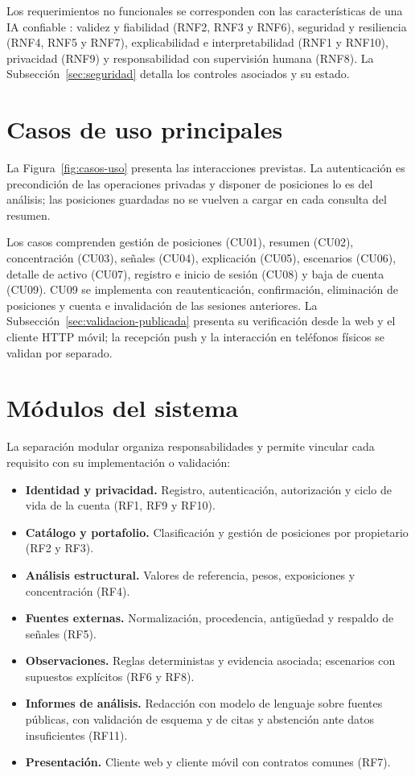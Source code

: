 Los requerimientos no funcionales se corresponden con las características de una IA confiable \parencite{NIST2023airmf}: validez y fiabilidad (RNF2, RNF3 y RNF6), seguridad y resiliencia (RNF4, RNF5 y RNF7), explicabilidad e interpretabilidad (RNF1 y RNF10), privacidad (RNF9) y responsabilidad con supervisión humana (RNF8). La Subsección~\ref{sec:seguridad} detalla los controles asociados y su estado.

\section{Casos de uso principales}\label{sec:casos-uso}

La Figura~\ref{fig:casos-uso} presenta las interacciones previstas. La autenticación es precondición de las operaciones privadas y disponer de posiciones lo es del análisis; las posiciones guardadas no se vuelven a cargar en cada consulta del resumen.


Los casos comprenden gestión de posiciones (CU01), resumen (CU02), concentración (CU03), señales (CU04), explicación (CU05), escenarios (CU06), detalle de activo (CU07), registro e inicio de sesión (CU08) y baja de cuenta (CU09). CU09 se implementa con reautenticación, confirmación, eliminación de posiciones y cuenta e invalidación de las sesiones anteriores. La Subsección~\ref{sec:validacion-publicada} presenta su verificación desde la web y el cliente HTTP móvil; la recepción push y la interacción en teléfonos físicos se validan por separado.

\section{Módulos del sistema}\label{sec:modulos}

La separación modular organiza responsabilidades y permite vincular cada requisito con su implementación o validación:
\begin{itemize}[nosep]
\item \textbf{Identidad y privacidad.} Registro, autenticación, autorización y ciclo de vida de la cuenta (RF1, RF9 y RF10).
\item \textbf{Catálogo y portafolio.} Clasificación y gestión de posiciones por propietario (RF2 y RF3).
\item \textbf{Análisis estructural.} Valores de referencia, pesos, exposiciones y concentración (RF4).
\item \textbf{Fuentes externas.} Normalización, procedencia, antigüedad y respaldo de señales (RF5).
\item \textbf{Observaciones.} Reglas deterministas y evidencia asociada; escenarios con supuestos explícitos (RF6 y RF8).
\item \textbf{Informes de análisis.} Redacción con modelo de lenguaje sobre fuentes públicas, con validación de esquema y de citas y abstención ante datos insuficientes (RF11).
\item \textbf{Presentación.} Cliente web y cliente móvil con contratos comunes (RF7).
\end{itemize}
